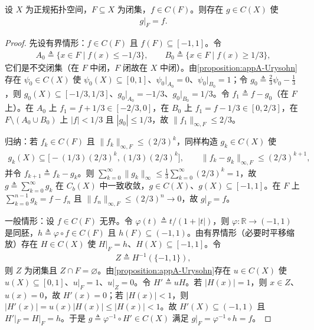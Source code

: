 \documentclass[../main.tex]{subfiles}
\begin{document}
\begin{proposition}\label{proposition:appA-Tietze}
设 $X$ 为正规拓扑空间，$F\subseteq X$ 为闭集，$f\in C(F)$。则存在 $g\in C(X)$ 使
\begin{align*}
g|_F=f.
\end{align*}
\end{proposition}

\begin{proof}
先设有界情形：$f\in C(F)$ 且 $f(F)\subseteq[-1,1]$。令
\begin{align*}
A_0\triangleq\{x\in F\mid f(x)\leqslant-1/3\},\qquad B_0\triangleq\{x\in F\mid f(x)\geqslant1/3\},
\end{align*}
它们是不交闭集（在 $F$ 中闭，$F$ 闭故在 $X$ 中闭）。由\cref{proposition:appA-Urysohn}存在 $\psi_0\in C(X)$ 使 $\psi_0(X)\subseteq[0,1]$、$\psi_0|_{A_0}=0$、$\psi_0|_{B_0}=1$；令 $g_0\triangleq\frac23\psi_0-\frac13$，则 $g_0(X)\subseteq[-1/3,1/3]$、$g_0|_{A_0}=-1/3$、$g_0|_{B_0}=1/3$。令 $f_1\triangleq f-g_0$（在 $F$ 上）。在 $A_0$ 上 $f_1=f+1/3\in[-2/3,0]$，在 $B_0$ 上 $f_1=f-1/3\in[0,2/3]$，在 $F\setminus(A_0\cup B_0)$ 上 $|f|<1/3$ 且 $|g_0|\leqslant1/3$，故 $\|f_1\|_{\infty,F}\leqslant2/3$。

归纳：若 $f_k\in C(F)$ 且 $\|f_k\|_{\infty,F}\leqslant(2/3)^k$，同样构造 $g_k\in C(X)$ 使
\begin{align*}
g_k(X)\subseteq\bigl[-(1/3)(2/3)^k,(1/3)(2/3)^k\bigr],\qquad \|f_k-g_k\|_{\infty,F}\leqslant(2/3)^{k+1},
\end{align*}
并令 $f_{k+1}\triangleq f_k-g_k$。则 $\sum_{k=0}^\infty\|g_k\|_\infty\leqslant\frac13\sum_{k=0}^\infty(2/3)^k=1$，故 $g\triangleq\sum_{k=0}^\infty g_k$ 在 $C_b(X)$ 中一致收敛，$g\in C(X)$、$g(X)\subseteq[-1,1]$。在 $F$ 上 $\sum_{k=0}^{n-1}g_k=f-f_n$ 且 $\|f_n\|_{\infty,F}\leqslant(2/3)^n\to0$，故 $g|_F=f$。

一般情形：设 $f\in C(F)$ 无界。令 $\varphi(t)\triangleq t/(1+|t|)$，则 $\varphi:\mathbb{R}\to(-1,1)$ 是同胚，$h\triangleq\varphi\circ f\in C(F)$ 且 $h(F)\subseteq(-1,1)$。由有界情形（必要时平移缩放）存在 $H\in C(X)$ 使 $H|_F=h$、$H(X)\subseteq[-1,1]$。令
\begin{align*}
Z\triangleq H^{-1}(\{-1,1\}),
\end{align*}
则 $Z$ 为闭集且 $Z\cap F=\varnothing$。由\cref{proposition:appA-Urysohn}存在 $u\in C(X)$ 使 $u(X)\subseteq[0,1]$、$u|_F=1$、$u|_Z=0$。令 $H'\triangleq uH$。若 $|H(x)|=1$，则 $x\in Z$、$u(x)=0$，故 $H'(x)=0$；若 $|H(x)|<1$，则 $|H'(x)|=u(x)|H(x)|\leqslant|H(x)|<1$。故 $H'(X)\subseteq(-1,1)$ 且 $H'|_F=H|_F=h$。于是 $g\triangleq\varphi^{-1}\circ H'\in C(X)$ 满足 $g|_F=\varphi^{-1}\circ h=f$。
\end{proof}
\end{document}
